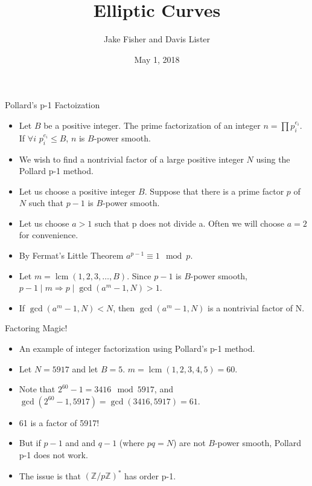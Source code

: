 \documentclass{beamer}
\title{Elliptic Curves}
\author{Jake Fisher and Davis Lister}
\date{May 1, 2018}
\DeclareMathOperator{\lcm}{lcm}
\begin{document}
	
	\begin{frame}
		\titlepage
	\end{frame}
	
	\begin{frame}{Pollard's p-1 Factoization}
		\begin{itemize}
			\item Let $B$ be a positive integer. The prime factorization of an integer $n=\prod p_{i}^{e_{i}}$. If $\forall i$ $p_{i}^{e_{i}} \leq B$, $n$ is $B$-power smooth.
			\item We wish to find a nontrivial factor of a large positive integer $N$ using the Pollard p-1 method.
			\item Let us choose a positive integer $B$. Suppose that there is a prime factor $p$ of $N$ such that $p-1$ is $B$-power smooth.
			\item Let us choose $a > 1$ such that p does not divide a. Often we will choose $a=2$ for convenience.
			\item By Fermat's Little Theorem $a^{p-1} \equiv 1 \mod p$.
			\item Let $m = \lcm (1,2,3,\dotso,B)$. Since $p-1$ is $B$-power smooth, $p-1 \mid m \Longrightarrow p \mid \gcd (a^m-1,N) > 1$.
			\item If $\gcd (a^m-1,N) < N$, then $\gcd (a^m-1,N)$ is a nontrivial factor of N.
		\end{itemize}
	\end{frame}
	
	\begin{frame}{Factoring Magic!}
		\begin{itemize}
			\item An example of integer factorization using Pollard's p-1 method.
			\item Let $N=5917$ and let $B=5$. $m=\lcm (1,2,3,4,5)=60$.
			\item Note that $2^{60}-1=3416 \mod 5917$, and $\gcd (2^{60}-1, 5917)=\gcd (3416, 5917)=61$.
			\item 61 is a factor of 5917!
			\item But if $p-1$ and and $q-1$ (where $pq=N$) are not $B$-power smooth, Pollard p-1 does not work.
			\item The issue is that $(\mathbb{Z}/p\mathbb{Z})^*$ has order p-1.
		\end{itemize}
	\end{frame}
	
\end{document}
